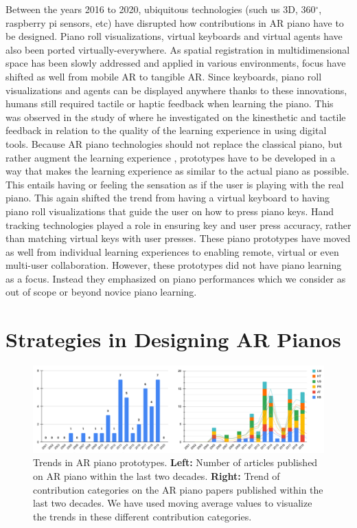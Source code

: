 \documentclass[manuscript,screen]{acmart}
\begin{document}
Between the years 2016 to 2020, ubiquitous technologies (such us 3D, 360$^{\circ}$, raspberry pi sensors, etc) have disrupted how contributions in AR piano have to be designed. Piano roll visualizations, virtual keyboards and virtual agents have also been ported virtually-everywhere. As spatial registration in multidimensional space has been slowly addressed \cite{roberts2011spatial,novotny2013applications, billinghurst2008tangible} and applied in various environments, focus have shifted as well from mobile AR to tangible AR. Since keyboards, piano roll visualizations and agents can be displayed anywhere thanks to these innovations, humans still required tactile or haptic feedback when learning the piano. This was observed in the study of \citet{hamam2013effect} where he investigated on the kinesthetic and tactile feedback in relation to the quality of the learning experience in using digital tools. Because AR piano technologies should not replace the classical piano, but rather augment the learning experience \cite{yang2020modern}, prototypes have to be developed in a way that makes the learning experience as similar to the actual piano as possible. This entails having or feeling the sensation as if the user is playing with the real piano. This again shifted the trend from having a virtual keyboard to having piano roll visualizations that guide the user on how to press piano keys. Hand tracking technologies played a role in ensuring key and user press accuracy, rather than matching virtual keys with user presses. These piano prototypes have moved as well from individual learning experiences to enabling remote, virtual or even multi-user collaboration. However, these prototypes did not have piano learning as a focus. Instead they emphasized on piano performances which we consider as out of scope or beyond novice piano learning. 

\section{Strategies in Designing AR Pianos}
\label{sec: strat}

\begin{figure}[t]
    \centering
    \includegraphics[width=15cm]{figures/doublechart.png}
    \caption{Trends in AR piano prototypes. \textbf{Left:} Number of articles published on AR piano within the last two decades. \textbf{Right:} Trend of contribution categories on the AR piano papers published within the last two decades. We have used moving average values to visualize the trends in these different contribution categories. }
    \label{fig:doublechart}
\end{figure}  
\end{document}

